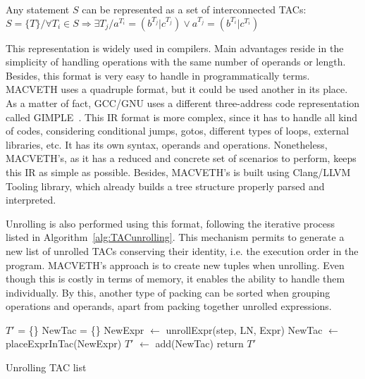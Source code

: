 \begin{corollary}\label{cor:TAC}
	Any statement $S$ can be represented as a set of interconnected TACs:
	$S = \{T\}/\forall T_{i} \in S \Rightarrow \exists T_{j} / a^{T_i} = 
	(b^{T_j} 
	| c^{T_j}) \lor a^{T_j} = (b^{T_i} 
	| c^{T_i}) $
\end{corollary}

This representation is widely used in compilers. Main advantages reside
in the simplicity of handling operations with the same number of operands or 
length. Besides, this format is very easy to handle in 
programmatically terms. MACVETH uses a quadruple 
format, but it could be used another in its place. As a matter of fact, 
GCC/GNU uses 
a different three-address code representation called 
GIMPLE~\cite{GCC:GIMPLE}. This IR format is more complex, since it has to 
handle all kind of codes, considering conditional jumps, gotos, different types 
of loops, external libraries, etc. It has its own syntax, operands and 
operations. Nonetheless, MACVETH's, as it has a reduced and concrete set of 
scenarios to perform, keeps this IR as simple as possible. Besides, MACVETH's 
is built using Clang/LLVM Tooling library, which already builds a 
tree structure properly parsed and interpreted.

Unrolling is also performed using this format, following the iterative process
listed in Algorithm~\ref{alg:TACunrolling}. This mechanism permits to generate 
a new list of unrolled TACs conserving their identity, i.e. the execution order 
in the 
program. MACVETH's approach is to create new tuples when unrolling. Even 
though this is costly in terms of memory, it enables the ability to handle  
them individually. By this, another type of packing can be sorted when grouping 
operations and operands, apart from packing together unrolled expressions.

\begin{algorithm}[h]\label{alg:TACunrolling}
	\SetAlgoLined
	$T'$ = \{\}\;
	 {
		 {
			 {
				NewTac = \{\}\;
				 {
					NewExpr $\leftarrow$ unrollExpr(step, LN, Expr)\;
					NewTac $\leftarrow$ placeExprInTac(NewExpr)\;
				}
				$T'$ $\leftarrow$ add(NewTac)\;
			}
		}
	}
	return $T'$\;
	\caption{Unrolling TAC list}
\end{algorithm}


